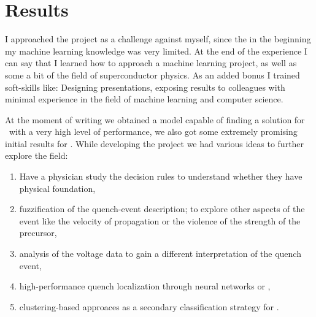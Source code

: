 \documentclass[a4paper, notitlepage]{article}
\begin{document}
\section{Results}
I approached the project as a challenge against myself, since the in the beginning my machine
learning knowledge was very limited. At the end of the experience I can say that I learned how to
approach a machine learning project, as well as some a bit of the field of superconductor physics.
As an added bonus I trained soft-skills like: Designing presentations, exposing results to
colleagues with minimal experience in the field of machine learning and computer science.

At the moment of writing we obtained a model capable of finding a solution for \qrp\ with a very
high level of performance, we also got some extremely promising initial results for \qlp. While
developing the project we had various ideas to further explore the field:
\begin{enumerate}
	\item Have a physician study the decision rules to understand whether they have physical
	      foundation,
	\item fuzzification of the quench-event description; to explore other aspects of the event
	      like the velocity of propagation or the violence of the strength of the precursor,
	\item analysis of the voltage data to gain a different interpretation of the quench event,
	\item high-performance quench localization through neural networks or \svcs,
	\item clustering-based approaces as a secondary classification strategy for \qlp.
\end{enumerate}

\printbibliography
\end{document}
